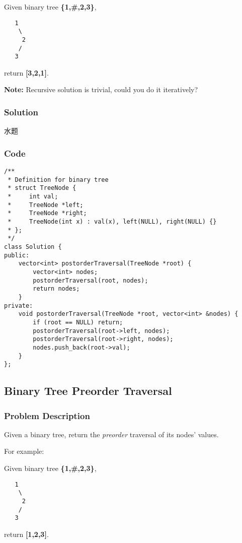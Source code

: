 \documentclass[courier]{article}
\begin{document}
\begin{CJK*}{UTF8}{gkai}
Given binary tree \textbf{\{1,\#,2,3\}},


\begin{verbatim}
   1
    \
     2
    /
   3
\end{verbatim}

return \textbf{[3,2,1]}.

\textbf{Note:} Recursive solution is trivial, could you do it iteratively?



\subsubsection*{Solution}
水题

\subsubsection*{Code}
\begin{lstlisting}
/**
 * Definition for binary tree
 * struct TreeNode {
 *     int val;
 *     TreeNode *left;
 *     TreeNode *right;
 *     TreeNode(int x) : val(x), left(NULL), right(NULL) {}
 * };
 */
class Solution {
public:
    vector<int> postorderTraversal(TreeNode *root) {
        vector<int> nodes;
        postorderTraversal(root, nodes);
        return nodes;
    }
private:
    void postorderTraversal(TreeNode *root, vector<int> &nodes) {
        if (root == NULL) return;
        postorderTraversal(root->left, nodes);
        postorderTraversal(root->right, nodes);
        nodes.push_back(root->val);
    }
}; 
\end{lstlisting}


\subsection{ Binary Tree Preorder Traversal }

\subsubsection*{Problem Description}
Given a binary tree, return the \emph{preorder} traversal of its nodes' values.

For example:


Given binary tree \textbf{\{1,\#,2,3\}},


\begin{verbatim}
   1
    \
     2
    /
   3
\end{verbatim}

return \textbf{[1,2,3]}.


\end{CJK*}
\end{document}
